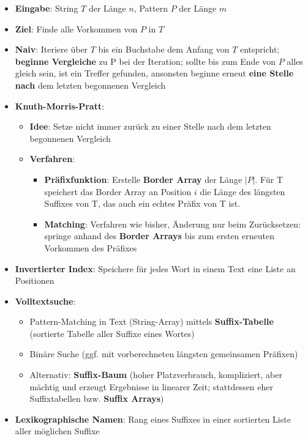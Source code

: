 \documentclass[10pt,a4paper]{article}
\begin{document}
	\begin{itemize}
		\item \textbf{Eingabe}: String $T$ der Länge $n$, Pattern $P$ der Länge $m$
		\item \textbf{Ziel}: Finde alle Vorkommen von $P$ in $T$
		\item \textbf{Naiv}: Iteriere über $T$ bis ein Buchstabe dem Anfang von $T$ entspricht; \textbf{beginne Vergleiche} zu P bei der Iteration; sollte bis zum Ende von $P$ alles gleich sein, ist ein Treffer gefunden, ansonsten beginne erneut \textbf{eine Stelle nach} dem letzten begonnenen Vergleich
		\item \textbf{Knuth-Morris-Pratt}:
		\begin{itemize}
			\item \textbf{Idee}: Setze nicht immer zurück zu einer Stelle nach dem letzten begonnenen Vergleich
			\item \textbf{Verfahren}:
			\begin{itemize}
				\item \textbf{Präfixfunktion}: Erstelle \textbf{Border Array} der Länge $|P|$. Für T speichert das Border Array an Position $i$ die Länge des längsten Suffixes von T, das auch ein echtes Präfix von T ist.
				\item \textbf{Matching}: Verfahren wie bisher, Änderung nur beim Zurücksetzen: springe anhand des \textbf{Border Arrays} bis zum ersten erneuten Vorkommen des Präfixes
			\end{itemize}
		\end{itemize}
		\item \textbf{Invertierter Index}: Speichere für jedes Wort in einem Text eine Liste an Positionen
		\newpage
		\item \textbf{Volltextsuche}:
		\begin{itemize}
			\item Pattern-Matching in Text (String-Array) mittels \textbf{Suffix-Tabelle} (sortierte Tabelle aller Suffixe eines Wortes)
			\item Binäre Suche (ggf. mit vorberechneten längsten gemeinsamen Präfixen)
			\item Alternativ: \textbf{Suffix-Baum} (hoher Platzverbrauch, kompliziert, aber mächtig und erzeugt Ergebnisse in linearer Zeit; stattdessen eher Suffixtabellen bzw. \textbf{Suffix Arrays})
		\end{itemize}
		\item \textbf{Lexikographische Namen}: Rang eines Suffixes in einer sortierten Liste aller möglichen Suffixe
	\end{itemize}
\end{document}
